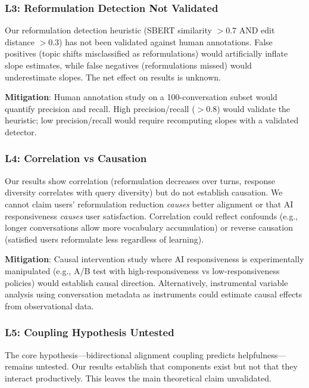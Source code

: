 \subsubsection{L3: Reformulation Detection Not Validated}

Our reformulation detection heuristic (SBERT similarity $> 0.7$ AND edit distance $> 0.3$) has not been validated against human annotations. False positives (topic shifts misclassified as reformulations) would artificially inflate slope estimates, while false negatives (reformulations missed) would underestimate slopes. The net effect on results is unknown.

\textbf{Mitigation}: Human annotation study on a 100-conversation subset would quantify precision and recall. High precision/recall ($>0.8$) would validate the heuristic; low precision/recall would require recomputing slopes with a validated detector.

\subsubsection{L4: Correlation vs Causation}

Our results show correlation (reformulation decreases over turns, response diversity correlates with query diversity) but do not establish causation. We cannot claim users' reformulation reduction \emph{causes} better alignment or that AI responsiveness \emph{causes} user satisfaction. Correlation could reflect confounds (e.g., longer conversations allow more vocabulary accumulation) or reverse causation (satisfied users reformulate less regardless of learning).

\textbf{Mitigation}: Causal intervention study where AI responsiveness is experimentally manipulated (e.g., A/B test with high-responsiveness vs low-responsiveness policies) would establish causal direction. Alternatively, instrumental variable analysis using conversation metadata as instruments could estimate causal effects from observational data.

\subsubsection{L5: Coupling Hypothesis Untested}

The core hypothesis---bidirectional alignment coupling predicts helpfulness---remains untested. Our results establish that components exist but not that they interact productively. This leaves the main theoretical claim unvalidated.

